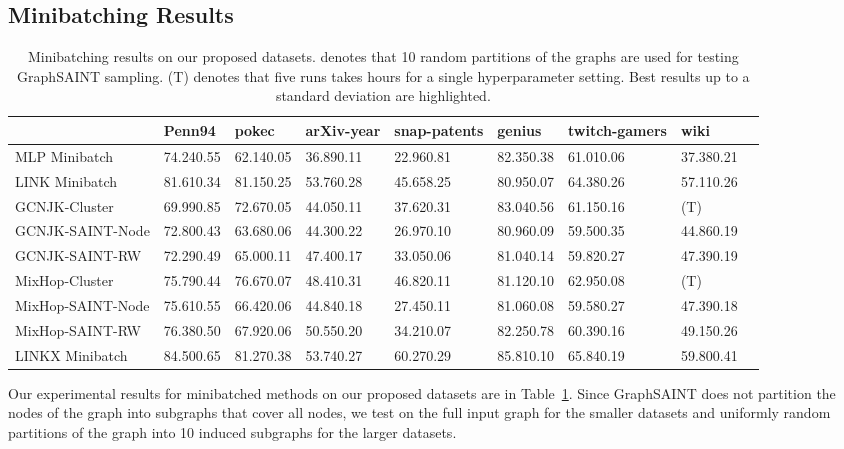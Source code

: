 \documentclass{article}
\newcommand{\bestcell}{\cellcolor{blue!25}}
\begin{document}
\subsection{Minibatching Results}\label{sec:mini_results}
\begin{table}[ht]
    \vspace{-5pt}
    \centering
	\caption{Minibatching results on our proposed datasets.  denotes that 10 random partitions of the graphs are used for testing GraphSAINT sampling. (T) denotes that five runs takes  hours for a single hyperparameter setting. Best results up to a standard deviation are highlighted.}
	\label{tab:mini_results}
    {\tiny
    \begin{tabular}{lllllllll}
    \toprule
	 & Penn94 & pokec  & arXiv-year & snap-patents  & genius  & twitch-gamers  & wiki   \\
    \midrule
    MLP Minibatch & 74.240.55  & 62.140.05  & 36.890.11 & 22.960.81 & 82.350.38 & 61.010.06 & 37.380.21 \\
    LINK Minibatch &  81.610.34 &  \bestcell 81.150.25 &  \bestcell 53.760.28 &  45.658.25 & 80.950.07 &  64.380.26 & 57.110.26 \\
	GCNJK-Cluster & 69.990.85 & 72.670.05 & 44.050.11 & 37.620.31 & 83.040.56 & 61.150.16 & (T) \\

	GCNJK-SAINT-Node & 72.800.43 & 63.680.06 & 44.300.22 & 26.970.10 & 80.960.09 & 59.500.35 & 44.860.19 \\
	GCNJK-SAINT-RW & 72.290.49 & 65.000.11 & 47.400.17 & 33.050.06 & 81.040.14 & 59.820.27 & 47.390.19 \\
	MixHop-Cluster & 75.790.44 & 76.670.07 & 48.410.31 & 46.820.11 & 81.120.10 & 62.950.08 & (T) \\
	MixHop-SAINT-Node & 75.610.55 & 66.420.06 & 44.840.18 & 27.450.11 & 81.060.08 & 59.580.27 & 47.390.18\\
	MixHop-SAINT-RW & 76.380.50 & 67.920.06 & 50.550.20 & 34.210.07 & 82.250.78 & 60.390.16 & 49.150.26 \\
	 \midrule
	LINKX Minibatch & \bestcell 84.500.65 & \bestcell 81.270.38 & \bestcell 53.740.27 & \bestcell 60.270.29 & \bestcell 85.810.10 & \bestcell 65.840.19 & \bestcell 59.800.41 \\
	 \bottomrule
    \end{tabular}
    }
    \vspace{-10pt}
\end{table}

Our experimental results for minibatched methods on our proposed datasets are in Table~\ref{tab:mini_results}. Since GraphSAINT does not partition the nodes of the graph into subgraphs that cover all nodes, we test on the full input graph for the smaller datasets and uniformly random partitions of the graph into 10 induced subgraphs for the larger datasets.
\end{document}
